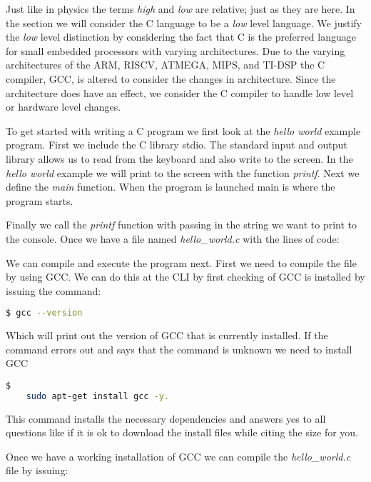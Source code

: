 Just like in physics the terms \emph{high} and \emph{low} are relative; just as they are here. In the section we will consider the C language to be a \emph{low} level language. We justify the \emph{low} level distinction by considering the fact that C is the preferred language for small embedded processors with varying architectures. Due to the varying architectures of the \ac{ARM}, \ac{RISCV}, \ac{ATMEGA}, \ac{MIPS}, and \ac{TI-DSP} the C compiler, \ac{GCC}, is altered to consider the changes in architecture. Since the architecture does have an effect, we consider the C compiler to handle low level or hardware level changes. 

To get started with writing a C program we first look at the \emph{hello world} example program. First we include the C library stdio. The standard input and output library allows us to read from the keyboard and also write to the screen. In the \emph{hello world} example we will print to the screen with the function \emph{printf}. Next we define the \emph{main} function. When the program is launched main is where the program starts.

Finally we call the \emph{printf} function with passing in the string we want to print to the console. Once we have a file named \emph{hello\_world.c} with the lines of code:



We can compile and execute the program next. First we need to compile the file by using \ac{GCC}. We can do this at the \ac{CLI} by first checking of \ac{GCC} is installed by issuing the command: 
	
\begin{lstlisting}[language=bash]    
	$ gcc --version
\end{lstlisting}
	
Which will print out the version of \ac{GCC} that is currently installed. If the command errors out and says that the command is unknown we need to install \ac{GCC}	
	
\begin{lstlisting}[language=bash]$ 
	sudo apt-get install gcc -y.
\end{lstlisting}

This command installs the necessary dependencies and answers yes to all questions like if it is ok to download the install files while citing the size for you.

Once we have a working installation of \ac{GCC} we can compile the \emph{hello\_world.c} file by issuing:

